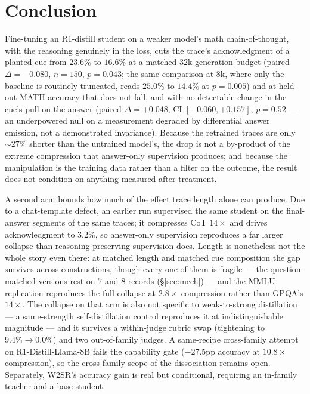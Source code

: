 \documentclass{article}
\begin{document}
\section{Conclusion}

Fine-tuning an R1-distill student on a weaker model's math chain-of-thought,
with the reasoning genuinely in the loss, cuts the trace's acknowledgment of a
planted cue from $23.6\%$ to $16.6\%$ at a matched $32$k generation budget
(paired $\Delta = -0.080$, $n = 150$, $p = 0.043$; the same comparison at 8k,
where only the baseline is routinely truncated, reads $25.0\%$ to $14.4\%$ at
$p = 0.005$) and at held-out MATH accuracy that does not fall, and with no detectable change in the cue's pull on
the answer (paired $\Delta = +0.048$, CI $[-0.060, +0.157]$, $p = 0.52$ --- an
underpowered null on a measurement degraded by differential answer emission,
not a demonstrated invariance). Because the retrained traces are only
${\sim}27\%$ shorter than the untrained model's, the drop is not a by-product
of the extreme compression that answer-only supervision produces; and because
the manipulation is the training data rather than a filter on the outcome, the
result does not condition on anything measured after treatment.

A second arm bounds how much of the effect trace length alone can produce. Due
to a chat-template defect, an earlier run supervised the same student on the
final-answer segments of the same traces; it compresses CoT $14\times$ and
drives acknowledgment to $3.2\%$, so answer-only supervision reproduces a far
larger collapse than reasoning-preserving supervision does. Length is
nonetheless not the whole story even there: at matched length and matched cue
composition the gap survives across constructions, though every one of them is
fragile --- the question-matched versions rest on $7$ and $8$ records
(\S\ref{sec:mech}) --- and the MMLU replication reproduces the full collapse at
$2.8\times$ compression rather than GPQA's $14\times$. The collapse on that
arm is also not specific to weak-to-strong distillation --- a same-strength
self-distillation control reproduces it at indistinguishable magnitude --- and
it survives a within-judge rubric swap (tightening to $9.4\% \to 0.0\%$) and
two out-of-family judges. A same-recipe cross-family attempt on
R1-Distill-Llama-8B fails the capability gate ($-27.5$pp accuracy at
$10.8\times$ compression), so the cross-family scope of the dissociation
remains open. Separately, W2SR's accuracy gain is real but conditional,
requiring an in-family teacher and a base student.
\end{document}

